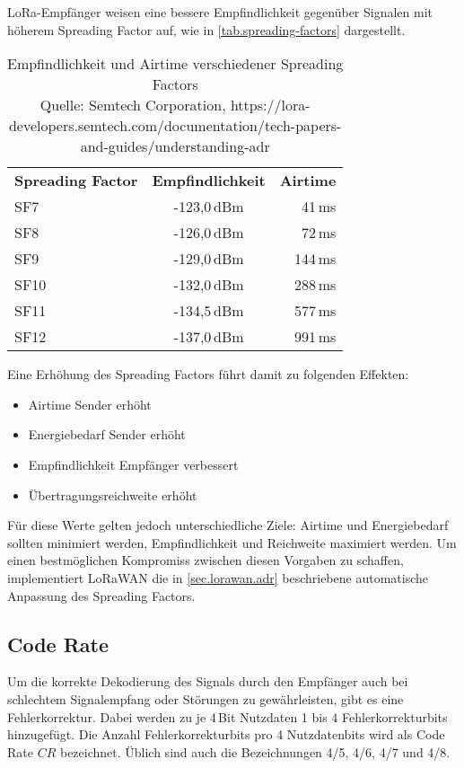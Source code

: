 LoRa-Empfänger weisen eine bessere Empfindlichkeit gegenüber Signalen mit höherem Spreading Factor auf, wie in \autoref{tab.spreading-factors} dargestellt.
\begin{table}[htbp]
\centering
\begin{tabular}{@{}lcr@{}}
\textbf{Spreading Factor} & \textbf{Empfindlichkeit} & \textbf{Airtime} \\
SF7  & -123,0\,dBm &  41\,ms \\
SF8  & -126,0\,dBm &  72\,ms \\
SF9  & -129,0\,dBm & 144\,ms \\
SF10 & -132,0\,dBm & 288\,ms \\
SF11 & -134,5\,dBm & 577\,ms \\
SF12 & -137,0\,dBm & 991\,ms \\
\end{tabular}
\caption[Empfindlichkeit und Airtime verschiedener Spreading Factors]{Empfindlichkeit und Airtime verschiedener Spreading Factors\\Quelle: Semtech Corporation, https://lora-developers.semtech.com/documentation/tech-papers-and-guides/understanding-adr}
\label{tab.spreading-factors}
\end{table}
Eine Erhöhung des Spreading Factors führt damit zu folgenden Effekten:
\begin{itemize}\singlespacing\setlength\itemsep{-0.2em}
\item Airtime Sender erhöht
\item Energiebedarf Sender erhöht
\item Empfindlichkeit Empfänger verbessert
\item Übertragungsreichweite erhöht
\end{itemize}
Für diese Werte gelten jedoch unterschiedliche Ziele: Airtime und Energiebedarf sollten minimiert werden, Empfindlichkeit und Reichweite maximiert werden.\cite{loralimits}
Um einen bestmöglichen Kompromiss zwischen diesen Vorgaben zu schaffen, implementiert LoRaWAN die in \autoref{sec.lorawan.adr} beschriebene automatische Anpassung des Spreading Factors.


\subsection{Code Rate}
Um die korrekte Dekodierung des Signals durch den Empfänger auch bei schlechtem Signalempfang oder Störungen zu gewährleisten, gibt es eine Fehlerkorrektur.
Dabei werden zu je 4\,Bit Nutzdaten 1 bis 4 Fehlerkorrekturbits hinzugefügt.
Die Anzahl Fehlerkorrekturbits pro 4 Nutzdatenbits wird als Code Rate $CR$ bezeichnet.
Üblich sind auch die Bezeichnungen 4/5, 4/6, 4/7 und 4/8.

